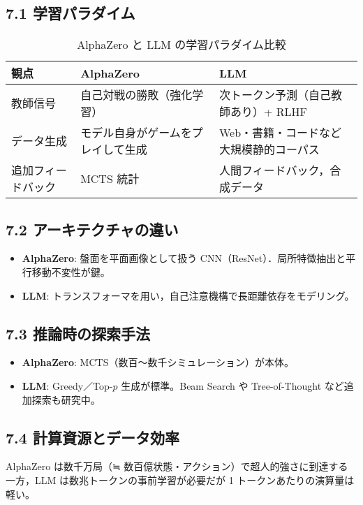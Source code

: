 \documentclass[a4paper,12pt]{article}
\begin{document}
\begin{CJK}{UTF8}{min}
\subsection*{7.1 学習パラダイム}
\begin{table}[htbp]
  \centering
  \caption{AlphaZero と LLM の学習パラダイム比較}
  \begin{tabular}{lll}
    \toprule
    観点 & AlphaZero & LLM \\
    \midrule
    教師信号 & 自己対戦の勝敗（強化学習） & 次トークン予測（自己教師あり）+ RLHF\\
    データ生成 & モデル自身がゲームをプレイして生成 & Web・書籍・コードなど大規模静的コーパス\\
    追加フィードバック & MCTS 統計 & 人間フィードバック，合成データ\\
    \bottomrule
  \end{tabular}
  \label{tab:paradigm}
\end{table}

\subsection*{7.2 アーキテクチャの違い}
\begin{itemize}
  \item \textbf{AlphaZero}: 盤面を平面画像として扱う CNN（ResNet）．局所特徴抽出と平行移動不変性が鍵。
  \item \textbf{LLM}: トランスフォーマを用い，自己注意機構で長距離依存をモデリング。
\end{itemize}

\subsection*{7.3 推論時の探索手法}
\begin{itemize}
  \item \textbf{AlphaZero}: MCTS（数百～数千シミュレーション）が本体。
  \item \textbf{LLM}: Greedy／Top-$p$ 生成が標準。Beam Search や Tree-of-Thought など追加探索も研究中。
\end{itemize}

\subsection*{7.4 計算資源とデータ効率}
AlphaZero は数千万局（≒ 数百億状態・アクション）で超人的強さに到達する一方，LLM は数兆トークンの事前学習が必要だが 1 トークンあたりの演算量は軽い。


\end{CJK}
\end{document}
